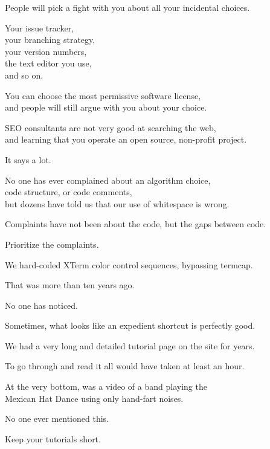 \documentclass[t,aspectratio=169]{beamer}
\begin{document}
\begin{frame}[fragile]%
    \vfill
    People will pick a fight with you about all your incidental choices. \pause

    Your issue tracker, \\
    your branching strategy, \\
    your version numbers, \\
    the text editor you use, \\
    and so on.
\end{frame}

\begin{frame}[fragile]%
    \vfill
    You can choose the most permissive software license, \\
    and people will still argue with you about your choice.
\end{frame}

\begin{frame}[fragile]%
    \vfill
    SEO consultants are not very good at searching the web, \pause \\
    and learning that you operate an open source, non-profit project. \pause

    It says a lot.
\end{frame}

\begin{frame}[fragile]%
    \vfill
    No one has ever complained about an algorithm choice, \\
    code structure, or code comments, \pause \\
    but dozens have told us that our use of whitespace is wrong. \pause

    Complaints have not been about the code, but the gaps between code. \pause

    Prioritize the complaints.
\end{frame}

\begin{frame}[fragile]%
    \vfill
    We hard-coded XTerm color control sequences, bypassing termcap.

    That was more than ten years ago.

    No one has noticed. \pause

    Sometimes, what looks like an expedient shortcut is perfectly good.
\end{frame}

\begin{frame}[fragile]%
    \vfill
    We had a very long and detailed tutorial page on the site for years.

    To go through and read it all would have taken at least an hour. \pause

    At the very bottom, was a video of a band playing the \\
    Mexican Hat Dance using only hand-fart noises. \pause

    No one ever mentioned this.

    Keep your tutorials short.
\end{frame}
\end{document}

